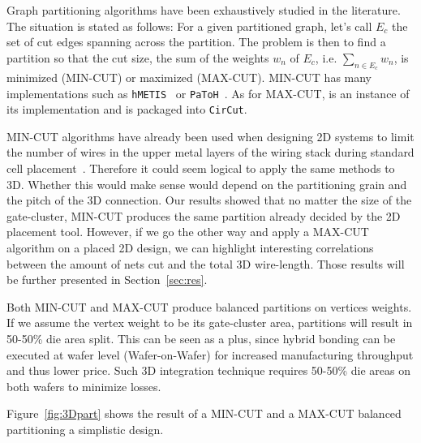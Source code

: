 \documentclass[conference]{IEEEtran}
\begin{document}
Graph partitioning algorithms have been exhaustively studied in the literature. The situation is stated as follows: For a given partitioned graph, let's call $E_c$ the set of cut edges spanning across the partition.
The problem is then to find a partition so that the cut size, the sum of the weights $w_n$ of $E_c$, i.e. $\sum_{n \in E_c} w_{n}$, is minimized (MIN-CUT) or maximized (MAX-CUT).
MIN-CUT has many implementations such as \texttt{hMETIS}~\cite{Karypis1999} or \texttt{PaToH}~\cite{Aykanat2011}. 
As for MAX-CUT, \cite{Burer2000} is an instance of its implementation and is packaged into \texttt{CirCut}.

MIN-CUT algorithms have already been used when designing 2D systems to limit the number of wires in the upper metal layers of the wiring stack during standard cell placement~\cite{KahngAndrewB.Lienig2011}. Therefore it could seem logical to apply the same methods to 3D. Whether this would make sense would depend on the partitioning grain and the pitch of the 3D connection. Our results showed that no matter the size of the gate-cluster, MIN-CUT produces the same partition already decided by the 2D placement tool. However, if we go the other way and apply a MAX-CUT algorithm on a placed 2D design, we can highlight interesting correlations between the amount of nets cut and the total 3D wire-length. Those results will be further presented in Section~\ref{sec:res}.

Both MIN-CUT and MAX-CUT produce balanced partitions on vertices weights. If we assume the vertex weight to be its gate-cluster area, partitions will result in 50-50\% die area split. This can be seen as a plus, since hybrid bonding can be executed at wafer level (Wafer-on-Wafer) for increased manufacturing throughput and thus lower price. Such 3D integration technique requires 50-50\% die areas on both wafers to minimize losses.

Figure~\ref{fig:3Dpart} shows the result of a MIN-CUT and a MAX-CUT balanced partitioning a simplistic design.
\end{document}
